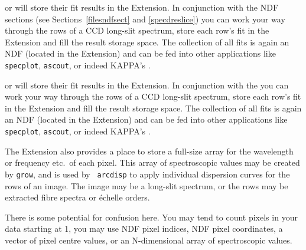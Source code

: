 \begin{latexonly}
{\tt{}}
   or
{\tt{}}
   will store their fit results in the Extension. In conjunction with
   the NDF sections
(see Sections~\ref{filesndfsect} and \ref{specdreslice}) 
   you can work your way through the rows of a CCD long-slit spectrum,
   store each row's fit in the Extension and fill the result storage
   space. The collection of all fits is again an NDF (located in the
   Extension) and can be fed into other applications like {\tt
   specplot}, {\tt ascout}, or indeed KAPPA's
{\tt{}}.
\end{latexonly}
\begin{htmlonly}
{\tt{}}
   or
{\tt{}}
   will store their fit results in the Extension. In conjunction with
   the
   you can work your way through the rows of a CCD long-slit spectrum,
   store each row's fit in the Extension and fill the result storage
   space. The collection of all fits is again an NDF (located in the
   Extension) and can be fed into other applications like {\tt
   specplot}, {\tt ascout}, or indeed KAPPA's
{\tt{}}.
\end{htmlonly}

   The Extension also provides a place to store a full-size array for
   the wavelength or frequency etc.\ of each pixel.  This array of
   spectroscopic values may be created by {\tt grow}, and is used by {\tt
   arcdisp} to apply individual dispersion curves for the rows of an image.
   The image may be a long-slit spectrum, or the rows may be extracted
   fibre spectra or \'echelle orders.

   There is some potential for confusion here.  You may tend to count
   pixels in your data starting at 1, you may use NDF pixel indices, NDF
   pixel coordinates, a vector of pixel centre values, or an
   N-dimensional array of spectroscopic values.

